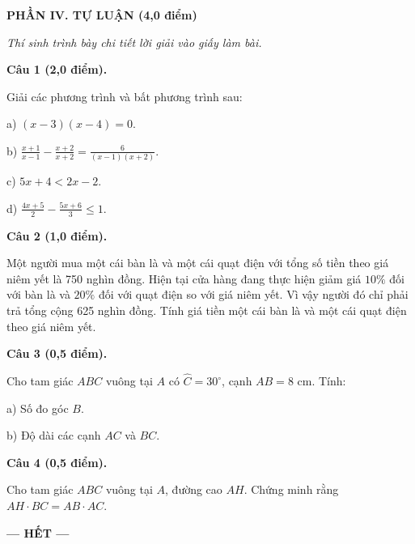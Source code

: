 \documentclass[12pt,a4paper]{article}
\begin{document}
\vspace{2mm}
\noindent\textbf{\large PHẦN IV. TỰ LUẬN (4,0 điểm)}

\textit{Thí sinh trình bày chi tiết lời giải vào giấy làm bài.}

\vspace{1mm}
\noindent\textbf{Câu 1 (2,0 điểm).}

Giải các phương trình và bất phương trình sau:\par a) $(x - 3)(x - 4) = 0$.\par b) $\frac{x + 1}{x - 1} - \frac{x + 2}{x + 2} = \frac{6}{(x - 1)(x + 2)}$.\par c) $5x + 4 < 2x - 2$.\par d) $\frac{4x + 5}{2} - \frac{5x + 6}{3} \le 1$.

\vspace{2mm}
\noindent\textbf{Câu 2 (1,0 điểm).}

Một người mua một cái bàn là và một cái quạt điện với tổng số tiền theo giá niêm yết là 750 nghìn đồng. Hiện tại cửa hàng đang thực hiện giảm giá $10\%$ đối với bàn là và $20\%$ đối với quạt điện so với giá niêm yết. Vì vậy người đó chỉ phải trả tổng cộng 625 nghìn đồng. Tính giá tiền một cái bàn là và một cái quạt điện theo giá niêm yết.

\vspace{2mm}
\noindent\textbf{Câu 3 (0,5 điểm).}

Cho tam giác $ABC$ vuông tại $A$ có $\widehat{C} = 30^\circ$, cạnh $AB = 8\text{ cm}$. Tính:\par a) Số đo góc $B$.\par b) Độ dài các cạnh $AC$ và $BC$.

\vspace{2mm}
\noindent\textbf{Câu 4 (0,5 điểm).}

Cho tam giác $ABC$ vuông tại $A$, đường cao $AH$. Chứng minh rằng $AH \cdot BC = AB \cdot AC$.

\vspace{2mm}

\vfill
\begin{center}
  \textbf{--- HẾT ---}
\end{center}
\end{document}
